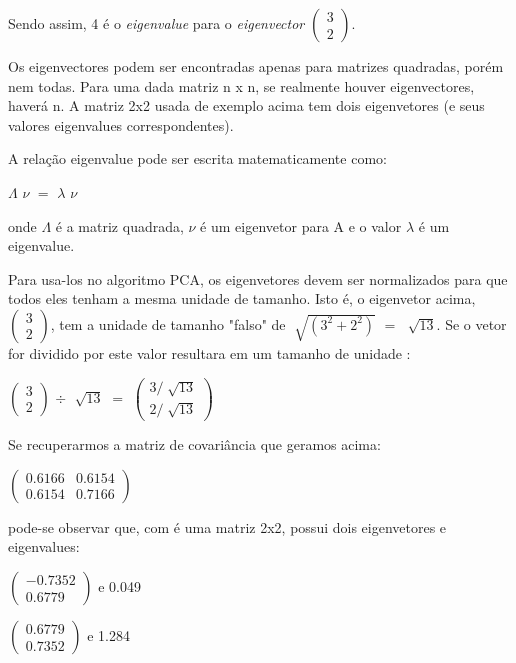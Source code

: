 Sendo assim, 4 é o \textit{eigenvalue} para o \textit{eigenvector}  $\begin{pmatrix} 3 \\ 2\end{pmatrix}$.

Os eigenvectores podem ser encontradas apenas para matrizes quadradas, porém nem todas. Para uma dada matriz n x n, se realmente houver eigenvectores, haverá n. A matriz 2x2 usada de exemplo acima tem dois eigenvetores (e seus valores eigenvalues correspondentes).

A relação eigenvalue pode ser escrita matematicamente como: 

 $\Lambda$ $\nu$  $=$  $\lambda$ $\nu$  

onde $\Lambda$ é a matriz quadrada, $\nu$ é um eigenvetor para A e o valor $\lambda$ é um eigenvalue.

Para usa-los no algoritmo PCA, os eigenvetores devem ser normalizados para que todos eles tenham a mesma unidade de tamanho. Isto é, o eigenvetor acima, $\begin{pmatrix} 3 \\ 2\end{pmatrix}$, tem a unidade de tamanho "falso" de  $\sqrt[]{(3^2 + 2^2)}$ $=$ $\sqrt[]{13}$. Se o vetor for dividido por este valor resultara em um tamanho de unidade \cite{drmathew_java_programming}:

\begin{center}
	$\begin{pmatrix} 3 \\ 2 \end{pmatrix}$ 
	$\div$  
	$\sqrt[]{13}$ $=$ 
	$\begin{pmatrix} 3 / \sqrt[]{13} \\ 2/\sqrt[]{13} \end{pmatrix}$
\end{center}

Se recuperarmos a matriz de covariância que geramos acima:

\begin{center}
	$\begin{pmatrix} 0.6166 & 0.6154 \\ 0.6154 & 0.7166 \end{pmatrix}$
\end{center}

pode-se observar que, com é uma matriz 2x2, possui dois eigenvetores e eigenvalues:

\begin{center}
$\begin{pmatrix} -0.7352 \\ 0.6779 \end{pmatrix}$  e 0.049

$\begin{pmatrix} 0.6779 \\ 0.7352 \end{pmatrix}$  e 1.284
\end{center}


